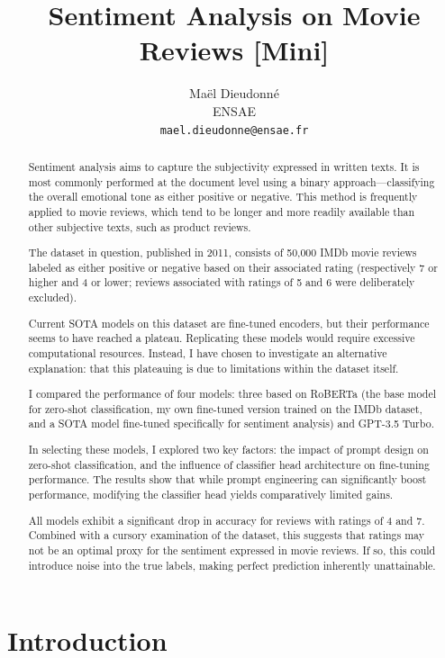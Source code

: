 \documentclass{article}
\title{Sentiment Analysis on Movie Reviews [Mini]}
\author{
  Maël Dieudonné\\
  ENSAE\\
  \texttt{mael.dieudonne@ensae.fr} \\
}
\begin{document}
\maketitle

\begin{abstract}
Sentiment analysis aims to capture the subjectivity expressed in written texts. It is most commonly performed at the document level using a binary approach---classifying the overall emotional tone as either positive or negative. This method is frequently applied to movie reviews, which tend to be longer and more readily available than other subjective texts, such as product reviews.

The dataset in question, published in 2011, consists of 50,000 IMDb movie reviews labeled as either positive or negative based on their associated rating (respectively 7 or higher and 4 or lower; reviews associated with ratings of 5 and 6 were deliberately excluded).

Current SOTA models on this dataset are fine-tuned encoders, but their performance seems to have reached a plateau. Replicating these models would require excessive computational resources. Instead, I have chosen to investigate an alternative explanation: that this plateauing is due to limitations within the dataset itself.

I compared the performance of four models: three based on RoBERTa (the base model for zero-shot classification, my own fine-tuned version trained on the IMDb dataset, and a SOTA model fine-tuned specifically for sentiment analysis) and GPT-3.5 Turbo.

In selecting these models, I explored two key factors: the impact of prompt design on zero-shot classification, and the influence of classifier head architecture on fine-tuning performance. The results show that while prompt engineering can significantly boost performance, modifying the classifier head yields comparatively limited gains.

All models exhibit a significant drop in accuracy for reviews with ratings of 4 and 7. Combined with a cursory examination of the dataset, this suggests that ratings may not be an optimal proxy for the sentiment expressed in movie reviews. If so, this could introduce noise into the true labels, making perfect prediction inherently unattainable.

\end{abstract}


\section{Introduction}
\end{document}
